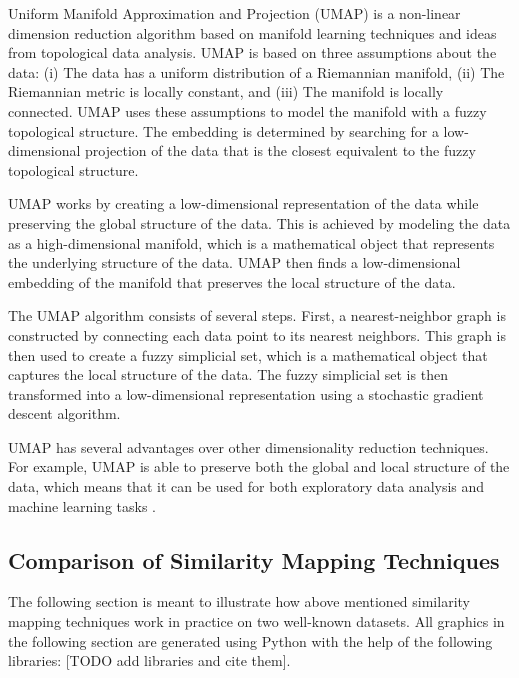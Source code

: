 Uniform Manifold Approximation and Projection (UMAP) is a non-linear
dimension reduction algorithm based on manifold learning techniques and
ideas from topological data analysis. UMAP is based on three assumptions
about the data: (i) The data has a uniform distribution of a Riemannian
manifold, (ii) The Riemannian metric is locally constant, and (iii) The
manifold is locally connected. UMAP uses these assumptions to model the
manifold with a fuzzy topological structure. The embedding is determined
by searching for a low-dimensional projection of the data that is the
closest equivalent to the fuzzy topological structure.

UMAP works by creating a low-dimensional representation of the data while
preserving the global structure of the data. This is achieved by modeling
the data as a high-dimensional manifold, which is a mathematical object
that represents the underlying structure of the data. UMAP then finds a
low-dimensional embedding of the manifold that preserves the local
structure of the data.

The UMAP algorithm consists of several steps. First, a nearest-neighbor
graph is constructed by connecting each data point to its nearest
neighbors. This graph is then used to create a fuzzy simplicial set, which
is a mathematical object that captures the local structure of the data.
The fuzzy simplicial set is then transformed into a low-dimensional
representation using a stochastic gradient descent algorithm.

UMAP has several advantages over other dimensionality reduction
techniques. For example, UMAP is able to preserve both the global and
local structure of the data, which means that it can be used for both
exploratory data analysis and machine learning tasks
\parencite{mcinnes2018umap}.


\subsection{Comparison of Similarity Mapping Techniques}

The following section is meant to illustrate how above mentioned
similarity mapping techniques work in practice on two well-known datasets.
All graphics in the following section are generated using Python with the
help of the following libraries: [TODO add libraries and cite them].

